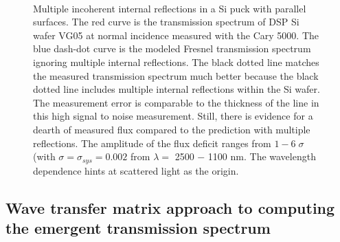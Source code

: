 \begin{figure}[h!] 
\begin{center}
\ 
\caption[Multiple incoherent internal reflections in a Si puck]{Multiple incoherent internal reflections in a Si puck with parallel surfaces.  The red curve is the transmission spectrum of DSP Si wafer VG05 at normal incidence measured with the Cary 5000.  The blue dash-dot curve is the modeled Fresnel transmission spectrum ignoring multiple internal reflections.  The black dotted line matches the measured transmission spectrum much better because the black dotted line includes multiple internal reflections within the Si wafer.  The measurement error is comparable to the thickness of the line in this high signal to noise measurement.  Still, there is evidence for a dearth of measured flux compared to the prediction with multiple reflections.  The amplitude of the flux deficit ranges from $1-6\; \sigma$ (with $\sigma=\sigma_{sys}=0.002$ from $\lambda=$ 2500 $-$ 1100 nm.  The wavelength dependence hints at scattered light as the origin.}

\label{fig:SiMultFresnel}
\end{center}
\end{figure}

\subsection{Wave transfer matrix approach to computing the emergent transmission spectrum}

